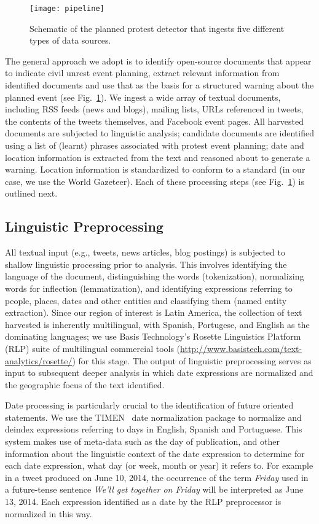 \begin{figure}
\texttt{[image: pipeline]}
\vspace{-2em}
\caption{Schematic of the planned protest detector that ingests five
different types of data sources.}
\label{flowchart}
\end{figure}
The general approach we adopt is to identify open-source documents
that appear to indicate civil unrest event planning, extract
relevant information from identified documents and use that as the
basis for a structured warning about the planned event (see Fig.~\ref{flowchart}).
We ingest a
wide array of textual documents, including RSS feeds (news and blogs),
mailing lists, URLs referenced in tweets, the contents of the tweets themselves,
and Facebook event pages.
All harvested documents are subjected to linguistic analysis; candidate
documents are identified using a list of (learnt) phrases associated with
protest event planning; date and location information is extracted from the
text and reasoned about to generate a warning. Location information is standardized
to conform to a standard (in our case, we use the World Gazeteer).
Each of these processing
steps (see Fig.~\ref{flowchart}) is outlined next.

\vspace{-0.5em}
\subsection{Linguistic Preprocessing}
All textual input (e.g., tweets, news articles, blog postings) is
subjected to shallow linguistic processing prior to analysis.  This
involves identifying the language of the document, distinguishing
the words (tokenization), normalizing words for inflection
(lemmatization), and identifying expressions referring to people,
places, dates and other entities and classifying them (named entity extraction). 
Since our region of interest is Latin America, the collection of text
harvested is inherently multilingual, with Spanish, Portugese, and English as
the dominating languages;
we use Basis Technology's Rosette Linguistics Platform (RLP) suite of multilingual commercial tools (\url{http://www.basistech.com/text-analytics/rosette/}) for this stage.
The output of linguistic preprocessing serves as input to subsequent deeper analysis in which 
date expressions are normalized and the geographic focus of the text identified.

Date processing is particularly crucial to the identification of
future oriented statements. We use the TIMEN~\cite{LlorensDGS12} date
normalization package to normalize and deindex expressions referring
to days in English, Spanish and Portuguese. This system makes use of
meta-data such as the day of publication, and other information about
the linguistic context of the date expression to determine for each
date expression, what day (or week, month or year) it refers to.  For
example in a tweet produced on June 10, 2014, the occurrence of the
term {\em Friday} used in a future-tense sentence {\em We'll get
  together on Friday} will be interpreted as June 13, 2014.  Each
expression identified as a date by the RLP preprocessor is normalized
in this way.

